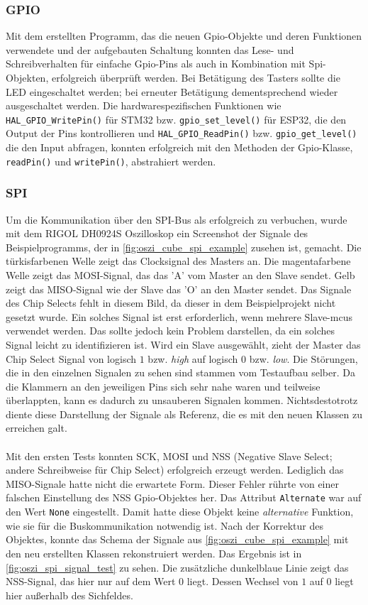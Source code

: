\subsubsection{GPIO}
Mit dem erstellten Programm, das die neuen Gpio-Objekte und deren Funktionen verwendete und der aufgebauten Schaltung konnten das Lese- und Schreibverhalten für einfache Gpio-Pins als auch in Kombination mit Spi-Objekten, erfolgreich überprüft werden.
Bei Betätigung des Tasters sollte die LED eingeschaltet werden; bei erneuter Betätigung dementsprechend wieder ausgeschaltet werden.
Die hardwarespezifischen Funktionen wie \texttt{HAL\_GPIO\_WritePin()} für STM32 bzw. \texttt{gpio\_set\_level()} für ESP32, die den Output der Pins kontrollieren und \texttt{HAL\_GPIO\_ReadPin()} bzw. \texttt{gpio\_get\_level()} die den Input abfragen,  konnten erfolgreich mit den Methoden der Gpio-Klasse, \texttt{readPin()} und \texttt{writePin()}, abstrahiert werden.

\subsubsection{SPI}
Um die Kommunikation über den SPI-Bus als erfolgreich zu verbuchen, wurde mit dem RIGOL DH0924S Oszilloskop \cite{rigol_dho900} ein Screenshot der Signale des Beispielprogramms, der in \cref{fig:oszi_cube_spi_example} zusehen ist, gemacht.
Die türkisfarbenen Welle zeigt das Clocksignal des Masters an.
Die magentafarbene Welle zeigt das MOSI-Signal, das das 'A' vom Master an den Slave sendet.
Gelb zeigt das MISO-Signal wie der Slave das 'O' an den Master sendet.
Das Signale des Chip Selects fehlt in diesem Bild, da dieser in dem Beispielprojekt nicht gesetzt wurde.
Ein solches Signal ist erst erforderlich, wenn mehrere Slave-\gls{mcu}s verwendet werden.
Das sollte jedoch kein Problem darstellen, da ein solches Signal leicht zu identifizieren ist.
Wird ein Slave ausgewählt, zieht der Master das Chip Select Signal von logisch $1$ bzw. \textit{high} auf logisch $0$ bzw. \textit{low}. 
Die Störungen, die in den einzelnen Signalen zu sehen sind stammen vom Testaufbau selber.
Da die Klammern an den jeweiligen Pins sich sehr nahe waren und teilweise überlappten, kann es dadurch zu unsauberen Signalen kommen.
Nichtsdestotrotz diente diese Darstellung der Signale als Referenz, die es mit den neuen Klassen zu erreichen galt.
\\
\\
Mit den ersten Tests konnten SCK, MOSI und NSS (Negative Slave Select; andere Schreibweise für Chip Select) erfolgreich erzeugt werden.
Lediglich das MISO-Signale hatte nicht die erwartete Form.
Dieser Fehler rührte von einer falschen Einstellung des NSS Gpio-Objektes her.
Das Attribut \texttt{Alternate} war auf den Wert \texttt{None} eingestellt.
Damit hatte diese Objekt keine \textit{alternative} Funktion, wie sie für die Buskommunikation notwendig ist.
Nach der Korrektur des Objektes, konnte das Schema der Signale aus \cref{fig:oszi_cube_spi_example} mit den neu erstellten Klassen rekonstruiert werden.
Das Ergebnis ist in \cref{fig:oszi_spi_signal_test} zu sehen.
Die zusätzliche dunkelblaue Linie zeigt das NSS-Signal, das hier nur auf dem Wert $0$ liegt.
Dessen Wechsel von $1$ auf $0$ liegt hier außerhalb des Sichfeldes.

